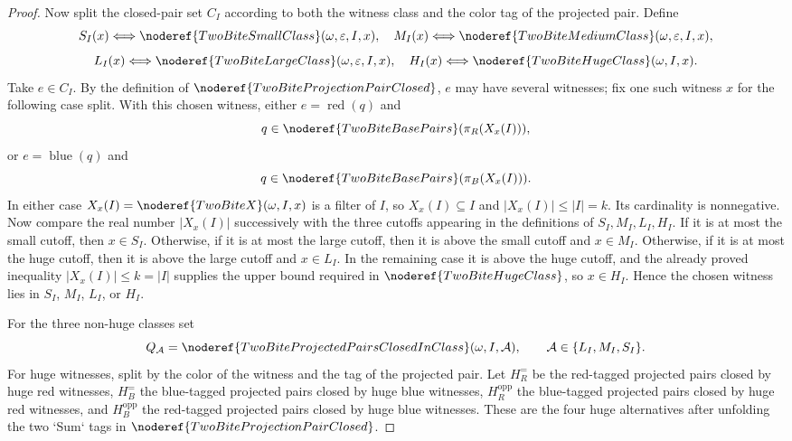 \begin{proof}
Now split the closed-pair set \(C_I\) according to both the witness class and
the color tag of the projected pair.  Define
\[
S_I(x)\Longleftrightarrow
\noderef{TwoBiteSmallClass}(\omega,\varepsilon,I,x),\quad
M_I(x)\Longleftrightarrow
\noderef{TwoBiteMediumClass}(\omega,\varepsilon,I,x),
\]
\[
L_I(x)\Longleftrightarrow
\noderef{TwoBiteLargeClass}(\omega,\varepsilon,I,x),\quad
H_I(x)\Longleftrightarrow
\noderef{TwoBiteHugeClass}(\omega,I,x).
\]
Take \(e\in C_I\).  By the definition of
\(\noderef{TwoBiteProjectionPairClosed}\), \(e\) may have several witnesses;
fix one such witness \(x\) for the following case split.  With this chosen
witness, either \(e=\operatorname{red}(q)\) and
\[
q\in\noderef{TwoBiteBasePairs}(\pi_R(X_x(I))),
\]
or \(e=\operatorname{blue}(q)\) and
\[
q\in\noderef{TwoBiteBasePairs}(\pi_B(X_x(I))).
\]
In either case \(X_x(I)=\noderef{TwoBiteX}(\omega,I,x)\) is a filter of \(I\),
so \(X_x(I)\subseteq I\) and \(|X_x(I)|\le |I|=k\).  Its cardinality is
nonnegative.  Now compare the real number \(|X_x(I)|\) successively with the
three cutoffs appearing in the definitions of \(S_I,M_I,L_I,H_I\).  If it is
at most the small cutoff, then \(x\in S_I\).  Otherwise, if it is at most the
large cutoff, then it is above the small cutoff and \(x\in M_I\).  Otherwise,
if it is at most the huge cutoff, then it is above the large cutoff and
\(x\in L_I\).  In the remaining case it is above the huge cutoff, and the
already proved inequality \(|X_x(I)|\le k=|I|\) supplies the upper bound
required in \(\noderef{TwoBiteHugeClass}\), so \(x\in H_I\).  Hence the chosen
witness lies in \(S_I\), \(M_I\), \(L_I\), or \(H_I\).

For the three non-huge classes set
\[
Q_{\mathcal A}
=\noderef{TwoBiteProjectedPairsClosedInClass}(\omega,I,\mathcal A),
\qquad
\mathcal A\in\{L_I,M_I,S_I\}.
\]
For huge witnesses, split by the color of the witness and the tag of the
projected pair.  Let \(H_R^{=}\) be the red-tagged projected pairs closed by
huge red witnesses, \(H_B^{=}\) the blue-tagged projected pairs closed by huge
blue witnesses, \(H_R^{\mathrm{opp}}\) the blue-tagged projected pairs closed
by huge red witnesses, and \(H_B^{\mathrm{opp}}\) the red-tagged projected
pairs closed by huge blue witnesses.  These are the four huge alternatives
after unfolding the two `Sum` tags in
\(\noderef{TwoBiteProjectionPairClosed}\).


\end{proof}
